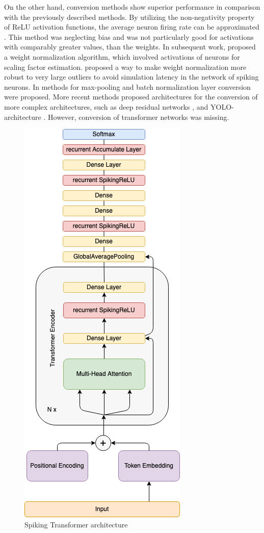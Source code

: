 \documentclass{article}
\begin{document}
On the other hand, conversion methods show superior performance in comparison with the previously described methods. By utilizing the non-negativity property of ReLU activation functions, the average neuron firing rate can be approximated \cite{conversion_first}. This method was neglecting bias and was not particularly good for activations with comparably greater values, than the weights. In subsequent work, \cite{diehl_fast_classifying} proposed a weight normalization algorithm, which involved activations of neurons for scaling factor estimation. \cite{rueckauer2016theory} proposed a way to make weight normalization more robust to very large outliers to avoid simulation latency in the network of spiking neurons. In \cite{conversion_continuous_valued} methods for max-pooling and batch normalization layer conversion were proposed. More recent methods proposed architectures for the conversion of more complex architectures, such as deep residual networks \cite{hu2020spiking}, \cite{deeper_spiking} and YOLO-architecture \cite{kim2019spikingyolo}. However, conversion of transformer networks \cite{transformer} was missing.

\begin{figure}[b!]
\begin{center}
\includegraphics[width=0.4 \textwidth]{SpikingTransformer.png}
\caption{Spiking Transformer architecture}
\label{fig:transformer}
\end{center}
\end{figure}
\end{document}
